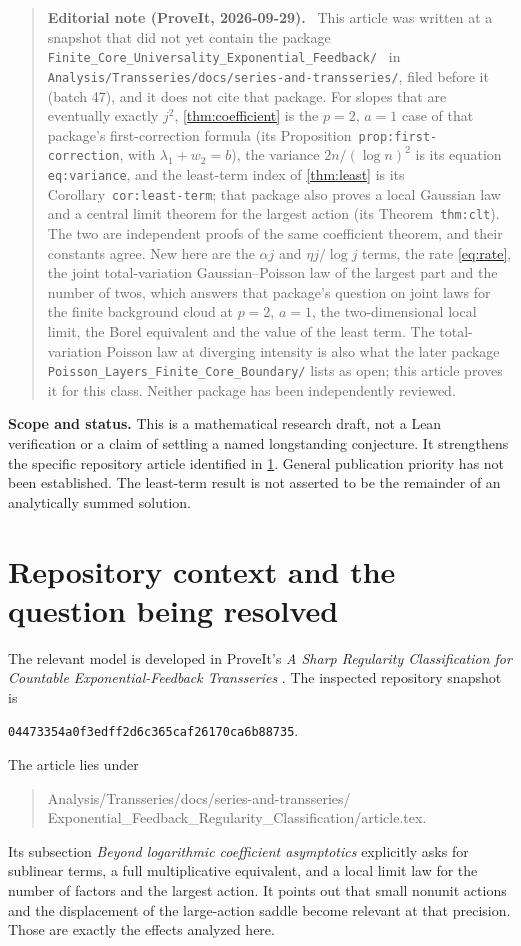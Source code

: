 \documentclass[11pt,a4paper]{article}
\theoremstyle{definition}
\numberwithin{equation}{section}
\newenvironment{ednote}{\par\smallskip\begin{quote}\small\raggedright\textbf{Editorial note (ProveIt, 2026-09-29).}\ }{\end{quote}\smallskip}
\begin{document}
\begin{ednote}
This article was written at a snapshot that did not yet contain the
package \nolinkurl{Finite_Core_Universality_Exponential_Feedback/}~\cite{ed:finitecore} in
\nolinkurl{Analysis/Transseries/docs/series-and-transseries/}, filed
before it (batch 47), and it does not cite that package. For slopes that
are eventually exactly $j^2$, \cref{thm:coefficient} is the $p=2$, $a=1$
case of that package's first-correction formula (its
Proposition~\texttt{prop:first-correction}, with $\lambda_1+w_2=b$), the variance
$2n/(\log n)^2$ is its equation \texttt{eq:variance}, and the least-term index of
\cref{thm:least} is its Corollary~\texttt{cor:least-term}; that package also
proves a local Gaussian law and a central limit theorem for the largest
action (its Theorem~\texttt{thm:clt}). The two are independent proofs of the same
coefficient theorem, and their constants agree. New here are the $\alpha j$
and $\eta j/\log j$ terms, the rate \eqref{eq:rate}, the joint
total-variation Gaussian--Poisson law of the largest part and the number of
twos, which answers that package's question on joint laws for the finite
background cloud at $p=2$, $a=1$, the two-dimensional local limit, the
Borel equivalent and the value of the least term. The total-variation
Poisson law at diverging intensity is also what the later package
\nolinkurl{Poisson_Layers_Finite_Core_Boundary/} lists as open; this
article proves it for this class. Neither package has been independently
reviewed.
\end{ednote}
\noindent\textbf{Scope and status.}
This is a mathematical research draft, not a Lean verification or a claim of
settling a named longstanding conjecture. It strengthens the specific
repository article identified in \cref{sec:context}. General publication
priority has not been established. The least-term result is not asserted to
be the remainder of an analytically summed solution.
\clearpage
\setcounter{tocdepth}{1}
\tableofcontents
\clearpage

\section{Repository context and the question being resolved}
\label{sec:context}
The relevant model is developed in ProveIt's
\emph{A Sharp Regularity Classification for Countable Exponential-Feedback
Transseries} \cite{repo-classification}. The inspected repository snapshot is
\begin{center}
\texttt{04473354a0f3edff2d6c365caf26170ca6b88735}.
\end{center}
The article lies under
\begin{quote}\small\ttfamily
Analysis/Transseries/docs/series-and-transseries/\\
Exponential\_Feedback\_Regularity\_Classification/article.tex.
\end{quote}
Its subsection \emph{Beyond logarithmic coefficient asymptotics} explicitly
asks for sublinear terms, a full multiplicative equivalent, and a local limit
law for the number of factors and the largest action. It points out that
small nonunit actions and the displacement of the large-action saddle become
relevant at that precision. Those are exactly the effects analyzed here.
\end{document}
